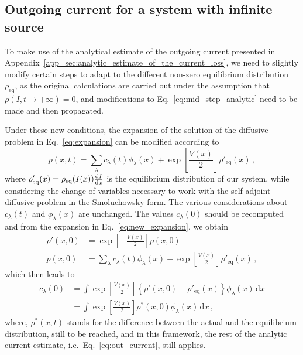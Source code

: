 \begin{chapterappendices}

\subsection{Outgoing current for a system with infinite source}\label{app_sec:outgoing_current_for_a_system_with_infinite_source}


To make use of the analytical estimate of the outgoing current presented in Appendix~\ref{app_sec:analytic_estimate_of_the_current_loss}, we need to slightly modify certain steps to adapt to the different non-zero equilibrium distribution $\rho_\text{eq}$, as the original calculations are carried out under the assumption that $\rho(I,t\to+\infty)=0$, and modifications to Eq.~\eqref{eq:mid_step_analytic} need to be made and then propagated.

Under these new conditions, the expansion of the solution of the diffusive problem in Eq.~\eqref{eq:expansion} can be modified according to 
\begin{equation}
    p(x, t) = \sum_\lambda c_\lambda(t) \phi_\lambda(x) + \exp\left[\frac{V(x)}{2}\right] \rho'_\text{eq}(x)\,,
    \label{eq:new_expansion}
\end{equation}
where $\rho'_\text{eq}(x) = \rho_\text{eq}(I(x))\dv{I}{x}$ is the equilibrium distribution of our system, while considering the change of variables necessary to work with the self-adjoint diffusive problem in the Smoluchowsky form. The various considerations about $c_\lambda(t)$ and $\phi_\lambda(x)$ are unchanged. The values $c_\lambda(0)$ should be recomputed and from the expansion in Eq.~\eqref{eq:new_expansion}, we obtain
\begin{align}
    \rho'(x, 0) &= \exp\left[-\frac{V(x)}{2}\right]p(x,0)\\
    p(x, 0) &= \sum_\lambda c_\lambda(t) \phi_\lambda(x) + \exp\left[\frac{V(x)}{2}\right] \rho'_\text{eq}(x)\,,
\end{align}
which then leads to
\begin{equation}
    \begin{aligned}
    c_\lambda(0) &= \int \exp\left[\frac{V(x)}{2}\right] \left\{\rho'(x,0) - \rho'_\text{eq}(x)\right\}\phi_\lambda(x)\, \mathrm{d}x \\
    &= \int \exp\left[\frac{V(x)}{2}\right] \rho^\ast(x,0)\phi_\lambda(x)\, \mathrm{d}x\,,
    \end{aligned}
\end{equation}
where, $\rho^\ast(x,t)$ stands for the difference between the actual and the equilibrium distribution, still to be reached, and in this framework, the rest of the analytic current estimate, i.e.\ Eq.~\eqref{eq:out_current}, still applies.
\end{chapterappendices}